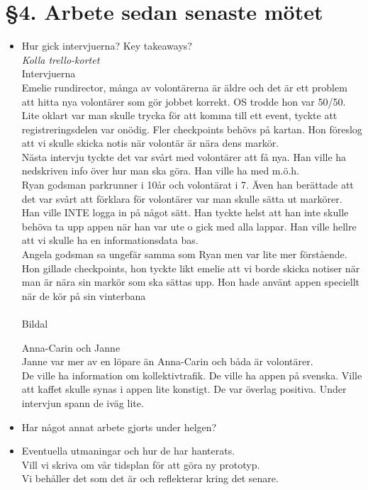 \documentclass[a4paper, 11pt]{article}
\begin{document}
\section*{§4. Arbete sedan senaste mötet}
\begin{itemize}
    \item Hur gick intervjuerna? Key takeaways?\\
            \textit{Kolla trello-kortet}
            \\Intervjuerna \\
            Emelie rundirector, många av volontärerna är äldre och det är ett problem att hitta nya volontärer som gör jobbet korrekt. OS trodde hon var 50/50. Lite oklart var man skulle trycka för att komma till ett event, tyckte att registreringsdelen var onödig. Fler checkpoints behövs på kartan. Hon föreslog att vi skulle skicka notis när volontär är nära dens markör. \\ 
            Nästa intervju tyckte det var svårt med volontärer att få nya. Han ville ha nedskriven info över hur man ska göra. Han ville ha med m.ö.h. \\
            Ryan godsman parkrunner i 10år och volontärat i 7. Även han berättade att det var svårt att förklara för volontärer var man skulle sätta ut markörer. Han ville INTE logga in på något sätt. Han tyckte helst att han inte skulle behöva ta upp appen när han var ute o gick med alla lappar. Han ville hellre att vi skulle ha en informationsdata bas. \\ 
            Angela godsman sa ungefär samma som Ryan men var lite mer förstående.\\ 
            Hon gillade checkpoints, hon tyckte likt emelie att vi borde skicka notiser när man är nära sin markör som ska sättas upp. Hon hade använt appen speciellt när de kör på sin vinterbana \\ \\

            Bildal

            Anna-Carin och Janne \\
            Janne var mer av en löpare än Anna-Carin och båda är volontärer. \\ 
            De ville ha information om kollektivtrafik. De ville ha appen på svenska. Ville att kaffet skulle synas i appen lite konstigt. De var överlag positiva. Under intervjun spann de iväg lite. \\ 
            

            
    \item Har något annat arbete gjorts under helgen?\\
    \item Eventuella utmaningar och hur de har hanterats.\\
    Vill vi skriva om vår tidsplan för att göra ny prototyp. \\ Vi behåller det som det är och reflekterar kring det senare. 
\end{itemize}
\end{document}
